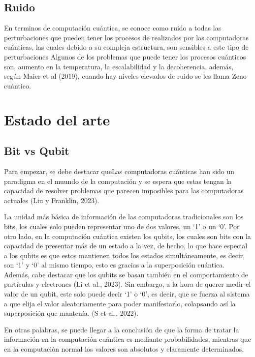 \documentclass[twoside]{article}
\begin{document}
\subsection{Ruido}
En terminos de computación cuántica, se conoce como ruido a todas las perturbaciones que pueden tener los procesos de realizados por las computadoras cuánticas, las cuales debido a su compleja estructura, son sensibles a este tipo de perturbaciones Algunos de los problemas que puede tener los procesos cuánticos son, aumento en la temperatura, la escalabilidad y la decoherencia, además, según Maier et al (2019), cuando hay niveles elevados de ruido se les llama Zeno cuántico. 

\newpage
\section{Estado del arte}
\subsection{Bit vs Qubit}
 Para empezar, se debe destacar queLas computadoras cuánticas han sido un paradigma en el muundo de la computación y se espera que estas tengan la capacidad de resolver problemas que parecen imposibles para las computadoras actuales (Liu y Franklin, 2023).
 
 La unidad más básica de información de las computadoras tradicionales son los bits, los cuales solo pueden representar uno de dos valores, un ‘1’ o un ‘0’. Por otro lado, en la computación cuántica existen los qubits, los cuales son bits con la capacidad de presentar más de un estado a la vez, de hecho, lo que hace especial a los qubits es que estos mantienen todos los estados simultáneamente, es decir, son ‘1’ y ‘0’ al mismo tiempo, esto es gracias a la superposición cuántica. Además, cabe destacar que los qubits se basan también en el comportamiento de partículas y electrones (Li et al., 2023). Sin embargo, a la hora de querer medir el valor de un qubit, este solo puede decir ‘1’ o ‘0’, es decir, que se fuerza al sistema a que elija el valor aleatoriamente para poder manifestarlo, colapsando así la superposición que mantenía. (S et al., 2022).

En otras palabras, se puede llegar a la conclusión de que la forma de tratar la información en la computación cuántica es mediante probabilidades, mientras que en la computación normal los valores son absolutos y claramente determinados.
\end{document}
